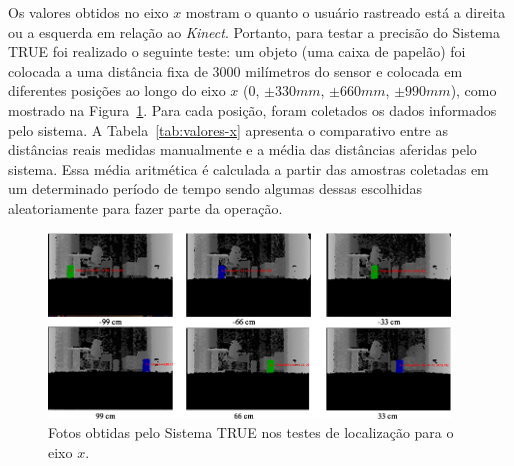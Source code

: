 	Os valores obtidos no eixo $\displaystyle x$ mostram o quanto o usuário
	rastreado está a direita ou a esquerda em relação ao \textit{Kinect}. Portanto,
	para testar a precisão do Sistema TRUE foi realizado o seguinte teste: um objeto
	(uma caixa de papelão) foi colocada a uma distância fixa de 3000 milímetros do
	sensor e colocada em diferentes posições ao longo do eixo $\displaystyle x$ (0,
	$\displaystyle \pm330mm$, $\displaystyle \pm660mm$, $\displaystyle \pm990mm$),
	como mostrado na Figura~\ref{fig:eixox-imgs}. Para cada posição, foram
	coletados os dados informados pelo sistema. A Tabela~\ref{tab:valores-x}
	apresenta o comparativo entre as distâncias reais medidas manualmente e a
	média das distâncias aferidas pelo sistema. Essa média aritmética é calculada
	a partir das amostras coletadas em um determinado período de tempo sendo
	algumas dessas escolhidas aleatoriamente para fazer parte da operação.


	\begin{figure}[htb]
		\begin{center}
			\includegraphics[width=0.95\textwidth]{figuras/5.Testes/eixox-imgs2.png}
		\end{center}
		\caption{Fotos obtidas pelo Sistema TRUE nos testes de localização para o eixo $\displaystyle x$.}
		\label{fig:eixox-imgs}
	\end{figure}

